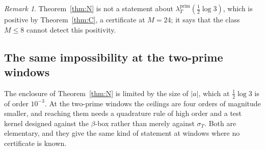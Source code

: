 \documentclass[11pt]{amsart}
\theoremstyle{definition}
\theoremstyle{remark}
\newtheorem{remark}[theorem]{Remark}
\newcommand{\lamP}{\lambda^{\mathrm{prim}}_T}
\newcommand{\sT}{\sigma_T}
\begin{document}
\begin{remark}
Theorem~\ref{thm:N} is not a statement about $\lamP(\frac12\log3)$, which is positive by
Theorem~\ref{thm:C}, a certificate at $M=24$; it says that the class $M\le8$ cannot detect this
positivity.
\end{remark}

\subsection{The same impossibility at the two-prime windows}\label{subsec:Np}

The enclosure of Theorem~\ref{thm:N} is limited by the size of $|a|$, which at $\frac12\log3$ is of
order $10^{-3}$. At the two-prime windows the ceilings are four orders of magnitude smaller, and
reaching them needs a quadrature rule of high order and a test kernel designed against the
$\beta$-box rather than merely against $\sT$. Both are elementary, and they give the same kind of
statement at windows where no certificate is known.
\end{document}
